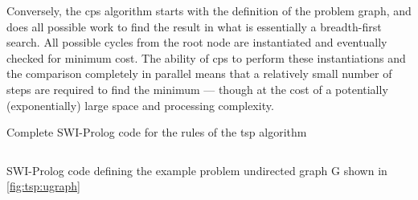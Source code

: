 Conversely, the \gls{cps} algorithm starts with the definition of the problem graph, and does all possible work to find the result in what is essentially a breadth-first search.  All possible cycles from the root node are instantiated and eventually checked for minimum cost. The ability of \gls{cps} to perform these instantiations and the comparison completely in parallel means that a relatively small number of steps are required to find the minimum --- though at the cost of a potentially (exponentially) large space and processing complexity.

\begin{listing}
\caption[Complete SWI-Prolog code for the  algorithm]{\label{app:tsp:codeprolog}Complete SWI-Prolog code for the rules of the \gls{tsp} algorithm}
\inputminted[linenos,breaklines,frame=lines,autogobble,firstline=5]{prolog}{chapters/tsp/code/tsp.pl.txt}
\end{listing}

\begin{listing}
\caption{\label{app:tsp:probprolog}SWI-Prolog code defining the example problem undirected graph G shown in \cref{fig:tsp:ugraph}}
\inputminted[linenos,breaklines,frame=lines,autogobble,lastline=3]{prolog}{chapters/tsp/code/tsp.pl.txt}
\end{listing}



